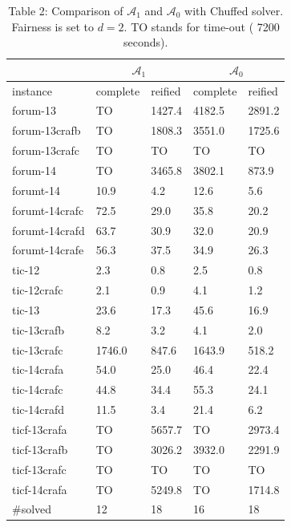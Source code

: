 \documentclass[10pt]{article}
\begin{document}
\begin{table}[h]
\begin{center}
\captionsetup{labelformat=empty}
\caption{Table 2: Comparison of $\mathcal{A}_{1}$ and $\mathcal{A}_{0}$ with Chuffed solver. Fairness is set to $d=2$. TO stands for time-out ( 7200 seconds).}
\begin{tabular}{|l|l|l|l|l|}
\hline
 & \multicolumn{2}{|c|}{$\mathcal{A}_{1}$} & \multicolumn{2}{|c|}{$\mathcal{A}_{0}$} \\
\hline
instance & complete & reified & complete & reified \\
\hline
forum-13 & TO & 1427.4 & 4182.5 & 2891.2 \\
\hline
forum-13crafb & TO & 1808.3 & 3551.0 & 1725.6 \\
\hline
forum-13crafc & TO & TO & TO & TO \\
\hline
forum-14 & TO & 3465.8 & 3802.1 & 873.9 \\
\hline
forumt-14 & 10.9 & 4.2 & 12.6 & 5.6 \\
\hline
forumt-14crafc & 72.5 & 29.0 & 35.8 & 20.2 \\
\hline
forumt-14crafd & 63.7 & 30.9 & 32.0 & 20.9 \\
\hline
forumt-14crafe & 56.3 & 37.5 & 34.9 & 26.3 \\
\hline
tic-12 & 2.3 & 0.8 & 2.5 & 0.8 \\
\hline
tic-12crafc & 2.1 & 0.9 & 4.1 & 1.2 \\
\hline
tic-13 & 23.6 & 17.3 & 45.6 & 16.9 \\
\hline
tic-13crafb & 8.2 & 3.2 & 4.1 & 2.0 \\
\hline
tic-13crafc & 1746.0 & 847.6 & 1643.9 & 518.2 \\
\hline
tic-14crafa & 54.0 & 25.0 & 46.4 & 22.4 \\
\hline
tic-14crafc & 44.8 & 34.4 & 55.3 & 24.1 \\
\hline
tic-14crafd & 11.5 & 3.4 & 21.4 & 6.2 \\
\hline
ticf-13crafa & TO & 5657.7 & TO & 2973.4 \\
\hline
ticf-13crafb & TO & 3026.2 & 3932.0 & 2291.9 \\
\hline
ticf-13crafc & TO & TO & TO & TO \\
\hline
ticf-14crafa & TO & 5249.8 & TO & 1714.8 \\
\hline
\#solved & 12 & 18 & 16 & 18 \\
\hline
\end{tabular}
\end{center}
\end{table}
\end{document}
